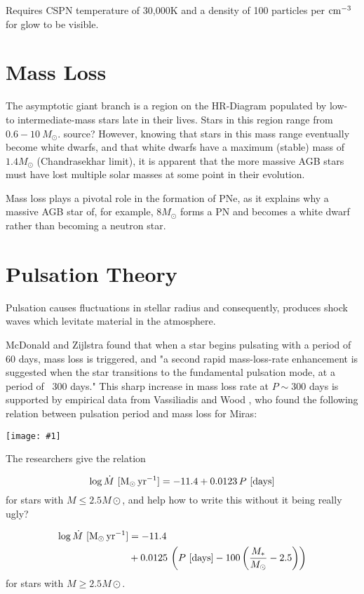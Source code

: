\documentclass[a4paper,11pt]{article}
\newcommand{\fig}[1]{\centerline{\texttt{[image: \#1]}}}
\begin{document}
Requires CSPN temperature of 30,000K and a density of 100 particles per ${\rm cm^{-3}}$ for glow to be visible.

\section{Mass Loss}

The asymptotic giant branch is a region on the HR-Diagram populated by low- to intermediate-mass stars late in their lives. Stars in this region range from $0.6-10~M_\odot$. {\huge source?} However, knowing that stars in this mass range eventually become white dwarfs, and that white dwarfs have a maximum (stable) mass of $1.4 M_\odot$ (Chandrasekhar limit), it is apparent that the more massive AGB stars must have lost multiple solar masses at some point in their evolution. 

Mass loss plays a pivotal role in the formation of PNe, as it explains why a massive AGB star of, for example, $8 M_\odot$ forms a PN and becomes a white dwarf rather than becoming a neutron star. 

\section{Pulsation Theory}

Pulsation causes fluctuations in stellar radius and consequently, produces shock waves which levitate material in the atmosphere. 

McDonald and Zijlstra found that when a star begins pulsating with a period of 60 days, mass loss is triggered, and "a second rapid mass-loss-rate enhancement is suggested when the star transitions to the fundamental pulsation mode, at a period of ~300 days."\cite{mcdonald} This sharp increase in mass loss rate at $P\sim 300$ days is supported by empirical data from Vassiliadis and Wood \cite{wood}, who found the following relation between pulsation period and mass loss for Miras:

\fig{pulsation_massloss}


The {\huge researchers} give the relation 

\begin{equation*}
    \log \dot M~{[\rm M_\odot\,yr^{-1}]} = -11.4 + 0.0123\,P~{[\rm days]}
\end{equation*}
for stars with $M\leq 2.5M\odot$, and {\huge help how to write this without it being really ugly?}

\begin{align*}
    \log \dot M~{[\rm M_\odot\,yr^{-1}]} &= -11.4 \\
                                         &+ 0.0125\,\left(P~{[\rm days]} - 100\left(\frac{M_*}{M_\odot} - 2.5\right)\right)
\end{align*}
for stars with $M\geq 2.5M\odot$. 
\end{document}
